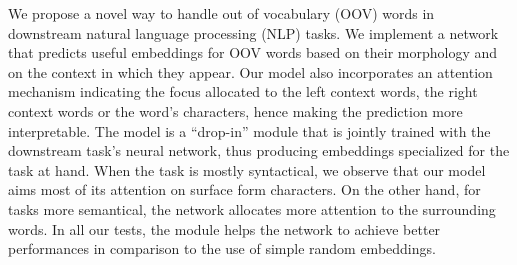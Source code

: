 We propose a novel way to handle out of vocabulary (OOV) words in downstream natural language processing (NLP) tasks. We implement a network that predicts useful embeddings for OOV words based on their morphology and on the context in which they appear. Our model also incorporates an attention mechanism indicating the focus allocated to the left context words, the right context words or the word's characters, hence making the prediction more interpretable. The model is a ``drop-in'' module that is jointly trained with the downstream task's neural network, thus producing embeddings specialized for the task at hand. When the task is mostly syntactical, we observe that our model aims most of its attention on surface form characters. On the other hand, for tasks more semantical, the network allocates more attention to the surrounding words. In all our tests, the module helps the network to achieve better performances in comparison to the use of simple random embeddings.

